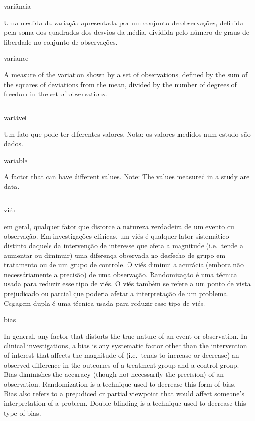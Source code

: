 \documentclass[
  openany]{book}
\begin{document}
variância

Uma medida da variação apresentada por um conjunto de observações, definida pela soma dos quadrados dos desvios da média, dividida pelo número de graus de liberdade no conjunto de observações.

variance

A measure of the variation shown by a set of observations, defined by the sum of the squares of deviations from the mean, divided by the number of degrees of freedom in the set of observations.

\begin{center}\rule{0.5\linewidth}{0.5pt}\end{center}

variável

Um fato que pode ter diferentes valores. Nota: os valores medidos num estudo são dados.

variable

A factor that can have different values. Note: The values measured in a study are data.

\begin{center}\rule{0.5\linewidth}{0.5pt}\end{center}

viés

em geral, qualquer fator que distorce a natureza verdadeira de um evento ou observação. Em investigações clínicas, um viés é qualquer fator sistemático distinto daquele da intervenção de interesse que afeta a magnitude (i.e.~tende a aumentar ou diminuir) uma diferença observada no desfecho de grupo em tratamento ou de um grupo de controle. O viés diminui a acurácia (embora não necessáriamente a precisão) de uma observação. Randomização é uma técnica usada para reduzir esse tipo de viés. O viés também se refere a um ponto de vista prejudicado ou parcial que poderia afetar a interpretação de um problema. Cegagem dupla é uma técnica usada para reduzir esse tipo de viés.

bias

In general, any factor that distorts the true nature of an event or observation. In clinical investigations, a bias is any systematic factor other than the intervention of interest that affects the magnitude of (i.e.~tends to increase or decrease) an observed difference in the outcomes of a treatment group and a control group. Bias diminishes the accuracy (though not necessarily the precision) of an observation. Randomization is a technique used to decrease this form of bias. Bias also refers to a prejudiced or partial viewpoint that would affect someone's interpretation of a problem. Double blinding is a technique used to decrease this type of bias.
\end{document}
